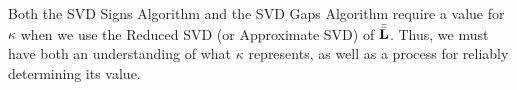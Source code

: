 \documentclass[../../ClusteringConnectionsMAIN.tex]{subfiles}
\begin{document}
\begin{flushleft}
\begin{large}


Both the SVD Signs Algorithm and the SVD Gaps Algorithm require a value for $\kappa$ when we use the Reduced SVD (or Approximate SVD) of $\bar{\bar{\mathbf{L}}}$.  Thus, we must have both an understanding of what  $\kappa$ represents, as well as a process for reliably determining its value.


\end{large}
\end{flushleft}
\end{document}

